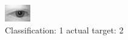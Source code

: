 \begin{figure}[h!]
\begin{center}
\includegraphics[width=0.60\columnwidth]{figures/ID426_class_1_target_2.png}
\end{center}
\caption{ Classification: 1 actual target: 2}
\label{fig:ID426_class_1_target_2}
\end{figure}

